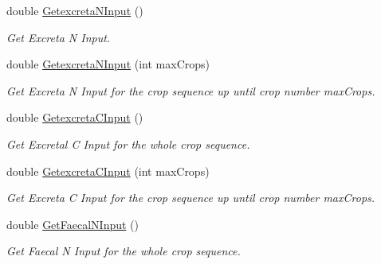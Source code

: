 \begin{DoxyCompactItemize}
double \mbox{\hyperlink{class_crop_sequence_class_a6796771f354e44de318c5801a1842285}{Getexcreta\+N\+Input}} ()
\begin{DoxyCompactList}\small\item\em Get Excreta N Input. \end{DoxyCompactList}\item 
\mbox{\label{class_crop_sequence_class_a93532b6d911e7ca60382fc1b56262bad}} 
double \mbox{\hyperlink{class_crop_sequence_class_a93532b6d911e7ca60382fc1b56262bad}{Getexcreta\+N\+Input}} (int max\+Crops)
\begin{DoxyCompactList}\small\item\em Get Excreta N Input for the crop sequence up until crop number max\+Crops. \end{DoxyCompactList}\item 
\mbox{\label{class_crop_sequence_class_a75833d7bee54d75e0c37c0e0294e8545}} 
double \mbox{\hyperlink{class_crop_sequence_class_a75833d7bee54d75e0c37c0e0294e8545}{Getexcreta\+C\+Input}} ()
\begin{DoxyCompactList}\small\item\em Get Excretal C Input for the whole crop sequence. \end{DoxyCompactList}\item 
\mbox{\label{class_crop_sequence_class_a1a450f8a00bdf08b51a6e2887414740c}} 
double \mbox{\hyperlink{class_crop_sequence_class_a1a450f8a00bdf08b51a6e2887414740c}{Getexcreta\+C\+Input}} (int max\+Crops)
\begin{DoxyCompactList}\small\item\em Get Excreta C Input for the crop sequence up until crop number max\+Crops. \end{DoxyCompactList}\item 
\mbox{\label{class_crop_sequence_class_afc5a4bc2374d2066bb750327ab3346b4}} 
double \mbox{\hyperlink{class_crop_sequence_class_afc5a4bc2374d2066bb750327ab3346b4}{Get\+Faecal\+N\+Input}} ()
\begin{DoxyCompactList}\small\item\em Get Faecal N Input for the whole crop sequence. \end{DoxyCompactList}\item 
\mbox{\label{class_crop_sequence_class_a10e45bf7094f9d5db7921651218e887c}} 

\end{DoxyCompactItemize}
